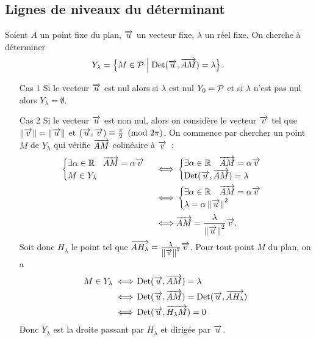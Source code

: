 \subsection{Lignes de niveaux du déterminant}
Soient $A$ un point fixe du plan, $\vu$ un vecteur fixe, $\lambda$ un réel fixe. On cherche à déterminer
\begin{equation} 
  Y_\lambda = \enstq{M \in \P}{\Det(\vu, \vect{AM})=\lambda}.
\end{equation}
\begin{enumerate}
\item[Cas 1] Si le vecteur $\vu$ est nul alors si $\lambda$ est nul $Y_0=\P$ et si $\lambda$ n'est pas nul alors $Y_\lambda=\emptyset$.
\item[Cas 2] Si le vecteur $\vu$ est non nul, alors on considère le vecteur $\vv$ tel que $\norme{\vv}=\norme{\vu}$ et $\congru{(\vu,\vv)}{\frac{\pi}{2}}{2\pi}$. On commence par chercher un point $M$ de $Y_\lambda$ qui vérifie $\vect{AM}$ colinéaire à $\vv$~:
  \begin{align}
    \begin{cases} \exists \alpha \in \R \quad \vect{AM}=\alpha \vv \\  M \in Y_\lambda\end{cases}  \iff & \begin{cases}\exists \alpha \in \R \quad \vect{AM}=\alpha \vv \\ \Det(\vu,\vect{AM})=\lambda\end{cases} \\
    \iff & \begin{cases} \exists \alpha \in \R \quad \vect{AM}=\alpha \vv \\ \lambda=\alpha \norme{\vu}^2\end{cases} \\
    \iff & \vect{AM}=\frac{\lambda}{\norme{\vu}^2} \vv.
  \end{align}
  Soit donc $H_\lambda$ le point tel que $\vect{AH_\lambda}=\frac{\lambda}{\norme{\vu}^2} \vv$. Pour tout point $M$ du plan, on a
  \begin{align}
    M \in Y_\lambda \iff & \Det(\vu,\vect{AM})=\lambda \\ 
    \iff & \Det(\vu,\vect{AM})=\Det(\vu,\vect{AH_\lambda}) \\ 
    \iff & \Det(\vu,\vect{H_\lambda M})=0
  \end{align}
  Donc $Y_\lambda$ est la droite passant par $H_\lambda$ et dirigée par $\vu$.
\end{enumerate}

